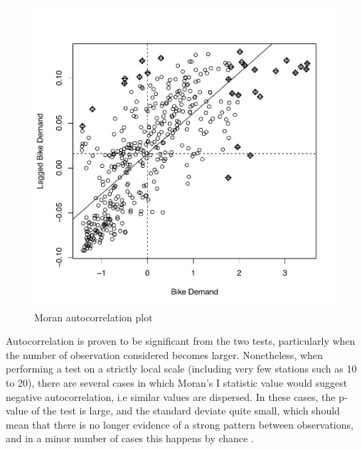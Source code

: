 \documentclass[12pt]{article}
\begin{document}
	\begin{figure}[H]
		\centering
		\includegraphics[scale=0.6]{Pictures/Moran_manhattan.pdf}
		\caption{Moran autocorrelation plot}\label{moran_plot}
	\end{figure}

\noindent
Autocorrelation is proven to be significant from the two tests, particularly when the number of observation considered becomes larger. Nonetheless, when performing a test on a strictly local scale (including very few stations such as 10 to 20), there are several cases in which Moran's I statistic value would suggest negative autocorrelation, i.e similar values are dispersed. In these cases, the p-value of the test is large, and the standard deviate quite small, which should mean that there is no longer evidence of a strong pattern between observations, and in a minor number of cases this happens by chance .
	
	
	
\end{document}
